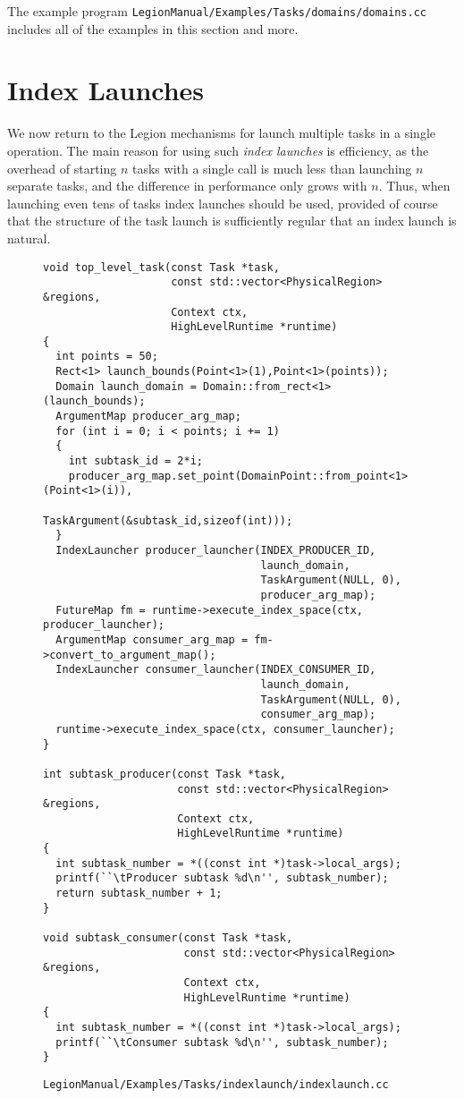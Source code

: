\documentclass[11pt]{book}
\newcommand{\legionbook}[1]{{\tt LegionManual/Examples/#1}}
\begin{document}
The example program \legionbook{Tasks/domains/domains.cc} includes all of the examples in this section and more.

\section{Index Launches}
\label{sec:indexlaunch}

We now return to the Legion mechanisms for launch multiple tasks in a
single operation.  The main reason for using such {\em index launches}
is efficiency, as the overhead of starting $n$ tasks with a single
call is much less than launching $n$ separate tasks, and the
difference in performance only grows with $n$.  Thus, when launching
even tens of tasks index launches should be used, provided of course
that the structure of the task launch is sufficiently regular that an
index launch is natural.

\begin{figure}
{\small
\begin{lstlisting}
void top_level_task(const Task *task,
                    const std::vector<PhysicalRegion> &regions,
                    Context ctx,
                    HighLevelRuntime *runtime)
{
  int points = 50;
  Rect<1> launch_bounds(Point<1>(1),Point<1>(points));
  Domain launch_domain = Domain::from_rect<1>(launch_bounds);
  ArgumentMap producer_arg_map;
  for (int i = 0; i < points; i += 1)
  {
    int subtask_id = 2*i;
    producer_arg_map.set_point(DomainPoint::from_point<1>(Point<1>(i)),
                               TaskArgument(&subtask_id,sizeof(int)));
  }
  IndexLauncher producer_launcher(INDEX_PRODUCER_ID,
                                  launch_domain,
                                  TaskArgument(NULL, 0),
                                  producer_arg_map);
  FutureMap fm = runtime->execute_index_space(ctx, producer_launcher);
  ArgumentMap consumer_arg_map = fm->convert_to_argument_map();
  IndexLauncher consumer_launcher(INDEX_CONSUMER_ID,
                                  launch_domain,
                                  TaskArgument(NULL, 0),
                                  consumer_arg_map);
  runtime->execute_index_space(ctx, consumer_launcher);
}

int subtask_producer(const Task *task,
                     const std::vector<PhysicalRegion> &regions,
                     Context ctx,
                     HighLevelRuntime *runtime)
{
  int subtask_number = *((const int *)task->local_args);
  printf(``\tProducer subtask %d\n'', subtask_number);
  return subtask_number + 1;
}

void subtask_consumer(const Task *task,
                      const std::vector<PhysicalRegion> &regions,
                      Context ctx,
                      HighLevelRuntime *runtime)
{
  int subtask_number = *((const int *)task->local_args);
  printf(``\tConsumer subtask %d\n'', subtask_number);
}
\end{lstlisting}
}
\caption{\legionbook{Tasks/indexlaunch/indexlaunch.cc}}
\label{fig:indexlaunch}
\end{figure}
\end{document}
